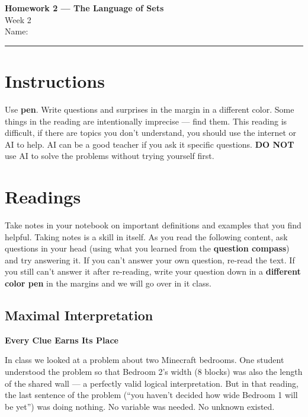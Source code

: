 \documentclass[12pt]{article}
\begin{document}
\pagestyle{fancy}
\begin{center}
  {\Large\bfseries Homework 2 --- The Language of Sets}\\[4pt]
  Week 2\\[6pt]
  Name:\;\underline{\hspace{6.5cm}}\quad
\end{center}
\hrule\bigskip
\section*{Instructions}
Use \textbf{pen}. Write questions and surprises in the margin in a different color.
Some things in the reading are intentionally imprecise --- find them. This reading is difficult,
if there are topics you don't understand, you should use the internet or AI to help. AI can be a good teacher
if you ask it specific questions. \textbf{DO NOT} use AI
to solve the problems without trying yourself first.
\section{Readings}
Take notes in your notebook on important definitions and examples that you find helpful. Taking notes
is a skill in itself. As you read the following content, ask questions in your head (using what you learned from the \textbf{question
compass}) and try answering it. If you can't answer your own question, re-read the text. If you still can't
answer it after re-reading, write your question down in a \textbf{different color pen} in the margins and we will go over in it class.
\subsection*{Maximal Interpretation}
\noindent\textbf{Every Clue Earns Its Place}

In class we looked at a problem about two Minecraft bedrooms.
One student understood the problem so that Bedroom 2's width (8 blocks) was also the
length of the shared wall --- a perfectly valid logical interpretation.
But in that reading, the last sentence of the problem
(``you haven't decided how wide Bedroom 1 will be yet'')
was doing nothing. No variable was needed. No unknown existed.
\end{document}
